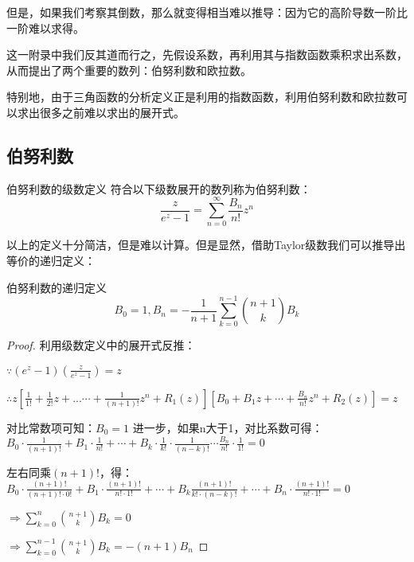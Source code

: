 \documentclass[12pt, a4paper, oneside, UTF8]{ctexbook}
\begin{document}
		但是，如果我们考察其倒数，那么就变得相当难以推导：因为它的高阶导数一阶比一阶难以求得。
		
		这一附录中我们反其道而行之，先假设系数，再利用其与指数函数乘积求出系数，从而提出了两个重要的数列：伯努利数和欧拉数。
		
		特别地，由于三角函数的分析定义正是利用的指数函数，利用伯努利数和欧拉数可以求出很多之前难以求出的展开式。
		
		\subsection{伯努利数}
			\begin{para}{0}
				\begin{defn}{伯努利数的级数定义}{}
					符合以下级数展开的数列称为伯努利数：
					\begin{equation}
						\frac{z}{e^z -1} = \sum_{n=0}^{\infty}\frac{B_n}{n!}z^n
					\end{equation}
				\end{defn}
				以上的定义十分简洁，但是难以计算。但是显然，借助Taylor级数我们可以推导出等价的递归定义：
				\begin{defn}{伯努利数的递归定义}{}
					\begin{equation}
						B_0=1,B_n=-\frac{1}{n+1}\sum\limits_{k=0}^{n-1}\binom{n+1}{k}B_{k}
					\end{equation}
				\end{defn}
				\begin{proof}
					利用级数定义中的展开式反推：
					
					$\because\left(e^z-1\right)\left(\frac{z}{e^z-1}\right)=z$
					
					$\therefore z\left[\frac{1}{1!}+\frac{1}{2!}z+...\cdots+\frac{1}{(n+1)!}z^n+R_1(z)\right]\left[B_0+B_1 z+\cdots+\frac{B_n}{n!}z^n+R_2(z)\right]=z$
					
					对比常数项可知：$B_0=1$
					进一步，如果n大于1，对比系数可得：
					$B_0\cdot\frac{1}{(n+1)!}+B_1\cdot\frac{1}{n!}+\cdots+B_k\cdot\frac{1}{k!}\cdot\frac{1}{(n-k)!}\cdots\frac{B_n}{n!}\cdot\frac{1}{1!}=0$
					
					左右同乘$(n+1)!$，得：
					$B_0\cdot\frac{(n+1)!}{(n+1)!\cdot 0!}+B_1\cdot\frac{(n+1)!}{n!\cdot 1!}+\cdots+B_k\frac{(n+1)!}{k!\cdot (n-k)!}+\cdots+B_n\cdot\frac{(n+1)!}{n!\cdot1!}=0$
					
					$\Rightarrow \sum\limits_{k=0}^{n} \binom{n+1}{k}B_k=0$
					
					$\Rightarrow \sum\limits_{k=0}^{n-1} \binom{n+1}{k}B_k=-(n+1)B_n$
					

\end{proof}
\end{para}
\end{document}
